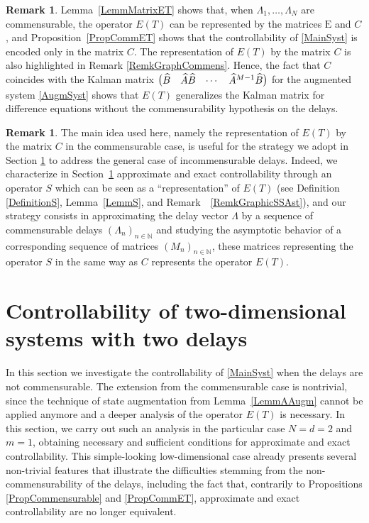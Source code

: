 \documentclass[10pt]{amsart}
\renewenvironment{bmatrix}{\bigl(\begin{matrix}}{\end{matrix}\bigr)}
\theoremstyle{plain}
\theoremstyle{definition}
\newtheorem{remk}[theo]{Remark}
\newcommand{\Epsilon}{\mathrm E}
\begin{document}
\begin{remk}
Lemma~\ref{LemmMatrixET} shows that, when $\Lambda_1, \dots, \Lambda_N$ are commensurable, the operator $E(T)$ can be represented by the matrices $\Epsilon$ and $C$, and Proposition~\ref{PropCommET} shows that the controllability of \eqref{MainSyst} is encoded only in the matrix $C$. The representation of $E(T)$ by the matrix $C$ is also highlighted in Remark \ref{RemkGraphCommens}. Hence, the fact that $C$ coincides with the Kalman matrix $\begin{bmatrix}\widehat B & \widehat A \widehat B & \cdots & \widehat A^{M-1} \widehat B\end{bmatrix}$ for the augmented system \eqref{AugmSyst} shows that $E(T)$ generalizes the Kalman matrix for difference equations without the commensurability hypothesis on the delays.
\end{remk}

\begin{remk}
\label{RemkCn}
The main idea used here, namely the representation of $E(T)$ by the matrix $C$ in the commensurable case, is useful for the strategy we adopt in Section \ref{SecTwoTwo} to address the general case of incommensurable delays. Indeed, we characterize in Section~\ref{SecTwoTwo} approximate and exact controllability through an operator $S$ which can be seen as a ``representation'' of $E(T)$ (see Definition \ref{DefinitionS}, Lemma~\ref{LemmS}, and Remark~ \ref{RemkGraphicSSAst}), and our strategy consists in approximating the delay vector $\Lambda$ by a sequence of commensurable delays $(\Lambda_n)_{n \in \mathbb N}$ and studying the asymptotic behavior of a corresponding sequence of matrices $(M_n)_{n \in \mathbb N}$, these matrices representing the operator $S$ in the same way as $C$ represents the operator $E(T)$.
\end{remk}

\section{Controllability of two-dimensional systems with two delays}
\label{SecTwoTwo}

In this section we investigate the controllability of \eqref{MainSyst} when the delays are not commensurable. The extension from the commensurable case is nontrivial, since the technique of state augmentation from Lemma~\ref{LemmAAugm} cannot be applied anymore and a deeper analysis of the operator $E(T)$ is necessary. In this section, we carry out such an analysis in the particular case $N = d = 2$ and $m = 1$, obtaining necessary and sufficient conditions for approximate and exact controllability. This simple-looking low-dimensional case already presents several non-trivial features that illustrate the difficulties stemming from the non-commensurability of the delays, including the fact that, contrarily to Propositions \ref{PropCommensurable} and \ref{PropCommET}, approximate and exact controllability are no longer equivalent.
\end{document}
